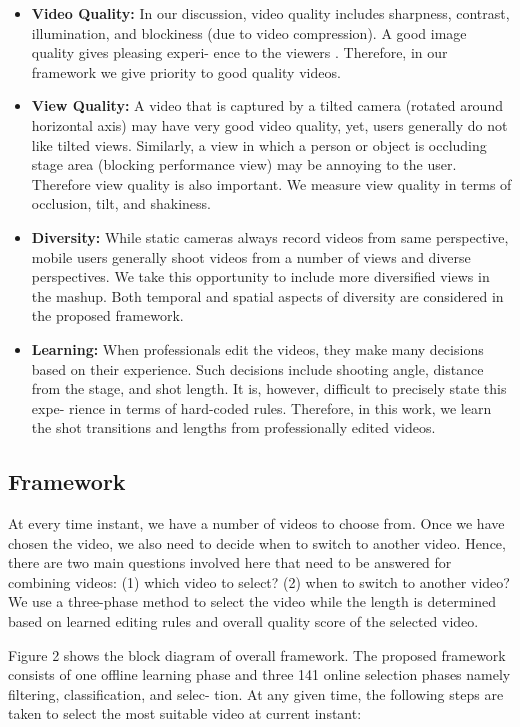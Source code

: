 \documentclass{new}
\begin{document}
\begin{itemize}
\item \textbf{Video Quality:} In our discussion, video quality includes
sharpness, contrast, illumination, and blockiness (due to video
compression). A good image quality gives pleasing experi-
ence to the viewers \cite{10}. Therefore, in our framework we
give priority to good quality videos.

\item \textbf{View Quality:} A video that is captured by a tilted camera
(rotated around horizontal axis) may have very good video
quality, yet, users generally do not like tilted views. Similarly, a view in which a person or object is occluding stage
area (blocking performance view) may be annoying to the user. Therefore view quality is also important. We measure
view quality in terms of occlusion, tilt, and shakiness.

\item \textbf{Diversity:} While static cameras always record videos from
same perspective, mobile users generally shoot videos from
a number of views and diverse perspectives. We take this
opportunity to include more diversified views in the mashup.
Both temporal and spatial aspects of diversity are considered
in the proposed framework.

\item \textbf{Learning:} When professionals edit the videos, they make
many decisions based on their experience. Such decisions
include shooting angle, distance from the stage, and shot
length. It is, however, difficult to precisely state this expe-
rience in terms of hard-coded rules. Therefore, in this work,
we learn the shot transitions and lengths from professionally
edited videos.
\end{itemize}
  
\subsection{Framework}
At every time instant, we have a number of videos to choose
from. Once we have chosen the video, we also need to decide when
to switch to another video. Hence, there are two main questions
involved here that need to be answered for combining videos: (1)
which video to select? (2) when to switch to another video? We
use a three-phase method to select the video while the length is
determined based on learned editing rules and overall quality score
of the selected video.

Figure 2 shows the block diagram of overall framework. The
proposed framework consists of one offline learning phase and three
141 online selection phases namely filtering, classification, and selec-
tion. At any given time, the following steps are taken to select the
most suitable video at current instant:
\end{document}
